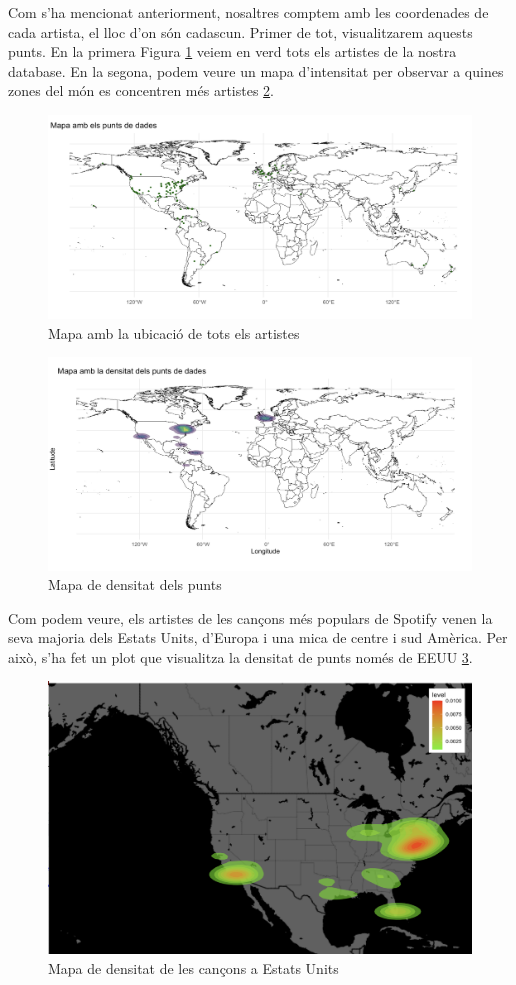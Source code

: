 Com s'ha mencionat anteriorment, nosaltres comptem amb les coordenades de cada artista, el lloc d'on són cadascun. Primer de tot, visualitzarem aquests punts. En la primera Figura \ref{fig:geo_mapa_punts} veiem en verd tots els artistes de la nostra database. En la segona, podem veure un mapa d'intensitat per observar a quines zones del món es concentren més artistes \ref{fig:geo_mapa_den}. \\

\begin{figure}[H]
    \centering
    \includegraphics[width=0.7\linewidth]{Images/7_Geospatial/1_descriptive/mapa_punts.png}
    \caption{Mapa amb la ubicació de tots els artistes}
    \label{fig:geo_mapa_punts}
\end{figure}

\begin{figure}[H]
    \centering
    \includegraphics[width=0.7\linewidth]{Images/7_Geospatial/1_descriptive/mapa_intensitat_punts.png}
    \caption{Mapa de densitat dels punts}
    \label{fig:geo_mapa_den}
\end{figure}

Com podem veure, els artistes de les cançons més populars de Spotify venen la seva majoria dels Estats Units, d'Europa i una mica de centre i sud Amèrica. Per això, s'ha fet un plot que visualitza la densitat de punts només de EEUU \ref{fig:geo_mapa_den_eua}. \\

\begin{figure}[H]
    \centering
    \includegraphics[width=0.6\linewidth]{Images/7_Geospatial/1_descriptive/mapa_densitat_eeuu.png}
    \caption{Mapa de densitat de les cançons a Estats Units}
    \label{fig:geo_mapa_den_eua}
\end{figure}

